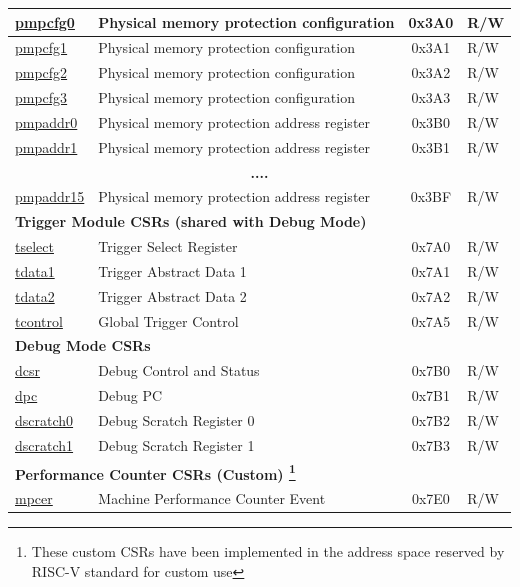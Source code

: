 \begin{longtable}{ | p{4.0cm} | p{8.4cm} | c | l | }
\hyperref[sec:riscvcpu-pmp-reg-desc]{pmpcfg0} & Physical memory protection configuration & 0x3A0 & R/W \\\hline
\hyperref[sec:riscvcpu-pmp-reg-desc]{pmpcfg1} & Physical memory protection configuration & 0x3A1 & R/W \\\hline
\hyperref[sec:riscvcpu-pmp-reg-desc]{pmpcfg2} & Physical memory protection configuration & 0x3A2 & R/W \\\hline
\hyperref[sec:riscvcpu-pmp-reg-desc]{pmpcfg3} & Physical memory protection configuration & 0x3A3 & R/W \\\hline
\hyperref[sec:riscvcpu-pmp-reg-desc]{pmpaddr0} & Physical memory protection address register & 0x3B0 & R/W \\\hline
\hyperref[sec:riscvcpu-pmp-reg-desc]{pmpaddr1} & Physical memory protection address register & 0x3B1 & R/W \\\hline
\multicolumn{4}{|c|}{\textbf{....}} \\\hline
\hyperref[sec:riscvcpu-pmp-reg-desc]{pmpaddr15} & Physical memory protection address register & 0x3BF & R/W \\\hline
\multicolumn{4}{|l|}{\textbf{Trigger Module CSRs (shared with Debug Mode)}} \\\hline
\hyperref[regdesc:TSELECT]{tselect} & Trigger Select Register & 0x7A0 & R/W \\\hline
\hyperref[regdesc:TDATA1]{tdata1} & Trigger Abstract Data 1 & 0x7A1 & R/W \\\hline
\hyperref[regdesc:TDATA2]{tdata2} & Trigger Abstract Data 2 & 0x7A2 & R/W \\\hline
\hyperref[regdesc:TCONTROL]{tcontrol} & Global Trigger Control & 0x7A5 & R/W \\\hline
\multicolumn{4}{|l|}{\textbf{Debug Mode CSRs}} \\\hline
\hyperref[regdesc:DCSR]{dcsr} & Debug Control and Status  & 0x7B0 & R/W \\\hline
\hyperref[regdesc:DPC]{dpc} & Debug PC & 0x7B1 & R/W \\\hline
\hyperref[regdesc:DSCRATCH0]{dscratch0} & Debug Scratch Register 0 & 0x7B2 & R/W \\\hline
\hyperref[regdesc:DSCRATCH1]{dscratch1} & Debug Scratch Register 1 & 0x7B3 & R/W \\\hline
\multicolumn{4}{|l|}{\textbf{Performance Counter CSRs (Custom) \footnote{These custom CSRs have been implemented in the address space reserved by RISC-V standard for custom use}}} \\\hline
\hyperref[regdesc:MPCER]{mpcer} & Machine Performance Counter Event & 0x7E0 & R/W \\\hline

\end{longtable}
